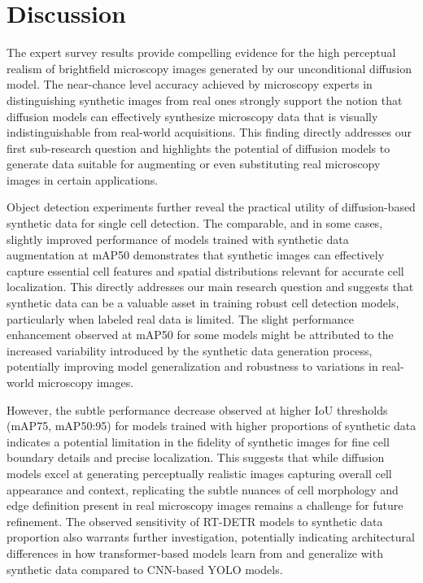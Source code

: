\section{Discussion}
\label{sec:discussion}
The expert survey results provide compelling evidence for the high perceptual realism of brightfield microscopy images generated by our unconditional diffusion model.
The near-chance level accuracy achieved by microscopy experts in distinguishing synthetic images from real ones strongly support the notion that diffusion models can effectively synthesize microscopy data that is visually indistinguishable from real-world acquisitions.
This finding directly addresses our first sub-research question and highlights the potential of diffusion models to generate data suitable for augmenting or even substituting real microscopy images in certain applications.

Object detection experiments further reveal the practical utility of diffusion-based synthetic data for single cell detection.
The comparable, and in some cases, slightly improved performance of models trained with synthetic data augmentation at mAP\@50 demonstrates that synthetic images can effectively capture essential cell features and spatial distributions relevant for accurate cell localization.
This directly addresses our main research question and suggests that synthetic data can be a valuable asset in training robust cell detection models, particularly when labeled real data is limited.
The slight performance enhancement observed at mAP\@50 for some models might be attributed to the increased variability introduced by the synthetic data generation process, potentially improving model generalization and robustness to variations in real-world microscopy images.

However, the subtle performance decrease observed at higher IoU thresholds (mAP\@75, mAP\@50:95) for models trained with higher proportions of synthetic data indicates a potential limitation in the fidelity of synthetic images for fine cell boundary details and precise localization.
This suggests that while diffusion models excel at generating perceptually realistic images capturing overall cell appearance and context, replicating the subtle nuances of cell morphology and edge definition present in real microscopy images remains a challenge for future refinement.
The observed sensitivity of RT-DETR models to synthetic data proportion also warrants further investigation, potentially indicating architectural differences in how transformer-based models learn from and generalize with synthetic data compared to CNN-based YOLO models.

